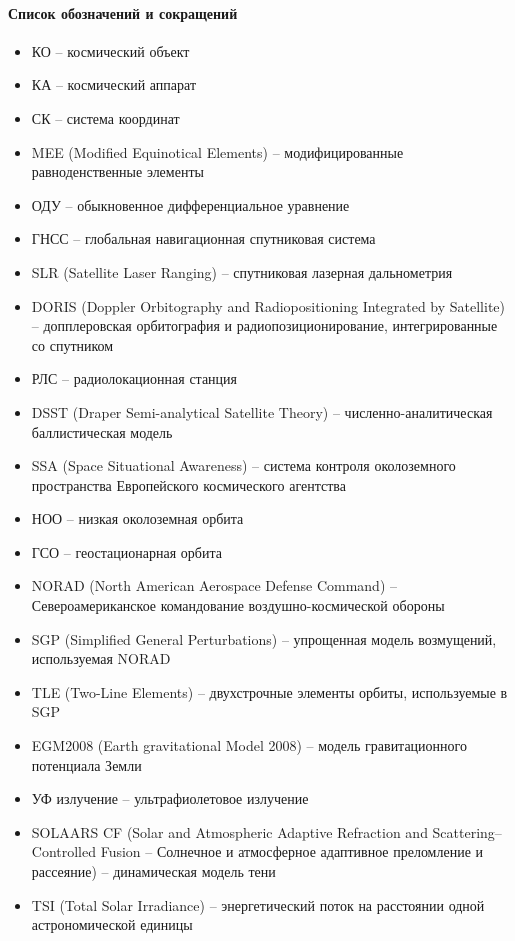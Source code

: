 \paragraph{Список обозначений и сокращений}

\begin{itemize}
    \item КО -- космический объект
    \item КА -- космический аппарат
    \item СК -- система координат
    \item MEE (Modified Equinotical Elements) -- модифицированные равноденственные элементы
    \item ОДУ -- обыкновенное дифференциальное уравнение
    \item ГНСС -- глобальная навигационная спутниковая система
    \item SLR (Satellite Laser Ranging) -- спутниковая лазерная дальнометрия
    \item DORIS (Doppler Orbitography and Radiopositioning Integrated by Satellite) -- допплеровская орбитография и радиопозиционирование, интегрированные со спутником
    \item РЛС -- радиолокационная станция
    \item DSST (Draper Semi-analytical Satellite Theory) -- численно-аналитическая баллистическая модель
    \item SSA (Space Situational Awareness) -- система контроля околоземного пространства Европейского космического агентства
    \item НОО -- низкая околоземная орбита
    \item ГСО -- геостационарная орбита
    \item NORAD (North American Aerospace Defense Command) -- Североамериканское командование воздушно-космической обороны
    \item SGP (Simplified General Perturbations) -- упрощенная модель возмущений, используемая NORAD
    \item TLE (Two-Line Elements) -- двухстрочные элементы орбиты, используемые в SGP
    \item EGM2008 (Earth gravitational Model 2008) -- модель гравитационного потенциала Земли
    \item УФ излучение -- ультрафиолетовое излучение
    \item SOLAARS CF (Solar and Atmospheric Adaptive Refraction and Scattering–Controlled Fusion
    -- Солнечное и атмосферное адаптивное преломление и рассеяние) -- динамическая модель тени
    \item TSI (Total Solar Irradiance) -- энергетический поток на расстоянии одной астрономической единицы
\end{itemize}

\newpage